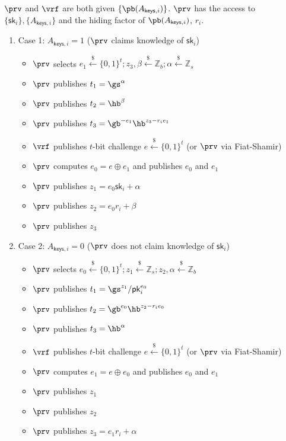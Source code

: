 
\begin{Protocol*}[t!]
\begin{mdframed}
$\prv$ and $\vrf$ are both given $\{\pb(A_{\mathsf{keys},i})\}$. $\prv$ has the access to $\{\mathsf{sk}_i\},\{A_{\mathsf{keys},i}\}$ and the hiding factor of $\pb(A_{\mathsf{keys},i})$, $r_i$.
\begin{enumerate}   
    \item Case 1: $A_{\mathsf{keys},i}=1$ ($\prv$ claims knowledge of $\mathsf{sk}_i$)
    \begin{itemize}  
        \item $\prv$ selects $e_1\stackrel{\$}{\leftarrow} \{0,1\}^t; z_3,\beta\stackrel{\$}{\leftarrow}\mathbb{Z}_b;\alpha\stackrel{\$}{\leftarrow}\mathbb{Z}_s$
        \item $\prv$ publishes  $t_1=\gs^\alpha$
        \item $\prv$ publishes $t_2=\hb^\beta$
        \item $\prv$ publishes  $t_3=\gb^{-e_1}\hb^{z_3-r_ie_1}$
        \item $\vrf$ publishes $t$-bit challenge $e\stackrel{\$}{\leftarrow} \{0,1\}^t$ (or $\prv$ via Fiat-Shamir)
        \item $\prv$ computes $e_0=e\oplus{e_1}$ and publishes $e_0$ and $e_1$
        \item $\prv$ publishes $z_1=e_0\mathsf{sk}_i+\alpha$
        \item $\prv$ publishes $z_2=e_0r_i+\beta$
        \item $\prv$ publishes $z_3$
    \end{itemize}
    
    \item Case 2: $A_{\mathsf{keys},i}=0$ ($\prv$ does not claim knowledge of $\mathsf{sk}_i$)
    \begin{itemize}  
        \item $\prv$ selects $e_0\stackrel{\$}{\leftarrow} \{0,1\}^t;z_1\stackrel{\$}{\leftarrow}\mathbb{Z}_s;z_2,\alpha\stackrel{\$}{\leftarrow}\mathbb{Z}_b$
        \item $\prv$ publishes $t_1=\gs^{z_1}/\mathsf{pk}_i^{e_0}$
        \item $\prv$ publishes $t_2=\gb^{e_0}\hb^{z_2-r_ie_0}$
        \item $\prv$ publishes $t_3=\hb^\alpha$
        \item $\vrf$ publishes $t$-bit challenge $e\stackrel{\$}{\leftarrow} \{0,1\}^t$ (or $\prv$ via Fiat-Shamir)
        \item $\prv$ computes $e_1=e\oplus{e_0}$ and publishes $e_0$ and $e_1$    
        \item $\prv$ publishes $z_1$
        \item $\prv$ publishes $z_2$
        \item $\prv$ publishes $z_3=e_1r_i+\alpha$
    \end{itemize}
    

\end{enumerate}
\end{mdframed}
\end{Protocol*}

